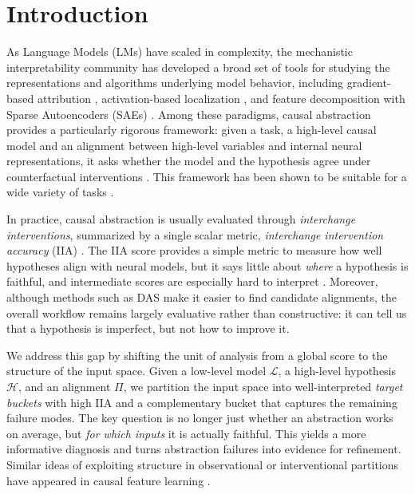 \section{Introduction}

As Language Models (LMs) have scaled in complexity, the mechanistic interpretability community has developed a broad set of tools for studying the representations and algorithms underlying model behavior, including gradient-based attribution \citep{sundararajan2017axiomatic}, activation-based localization \citep{meng2022locating,meng2022mass}, and feature decomposition with Sparse Autoencoders (SAEs) \citep{bricken2023towards,cunningham2023sparse}. Among these paradigms, causal abstraction provides a particularly rigorous framework: given a task, a high-level causal model and an alignment between high-level variables and internal neural representations, it asks whether the model and the hypothesis agree under counterfactual interventions \citep{geiger2021causal, geiger2025causal}. This framework has been shown to be suitable for a wide variety of tasks \citep{wu2024pyvene, arora-etal-2024-causalgym, huanginternal, boguraev-etal-2025-causal}.

In practice, causal abstraction is usually evaluated through \emph{interchange interventions}, summarized by a single scalar metric, \emph{interchange intervention accuracy} (IIA) \citep{geiger2021causal, geiger2025causal}. The IIA score provides a simple metric to measure how well hypotheses align with neural models, but it says little about \emph{where} a hypothesis is faithful, and intermediate scores are especially hard to interpret \citep{makelov2023subspace,wu2024reply,meloux2025everything}. Moreover, although methods such as DAS make it easier to find candidate alignments, the overall workflow remains largely evaluative rather than constructive: it can tell us that a hypothesis is imperfect, but not how to improve it.

We address this gap by shifting the unit of analysis from a global score to the structure of the input space. Given a low-level model \(\mathcal L\), a high-level hypothesis \(\mathcal H\), and an alignment \(\Pi\), we partition the input space into well-interpreted \emph{target buckets} with high IIA and a complementary bucket that captures the remaining failure modes. The key question is no longer just whether an abstraction works on average, but \emph{for which inputs} it is actually faithful. This yields a more informative diagnosis and turns abstraction failures into evidence for refinement. Similar ideas of exploiting structure in observational or interventional partitions have appeared in causal feature learning \citep{chalupka2014visual,chalupka2017causal}.

